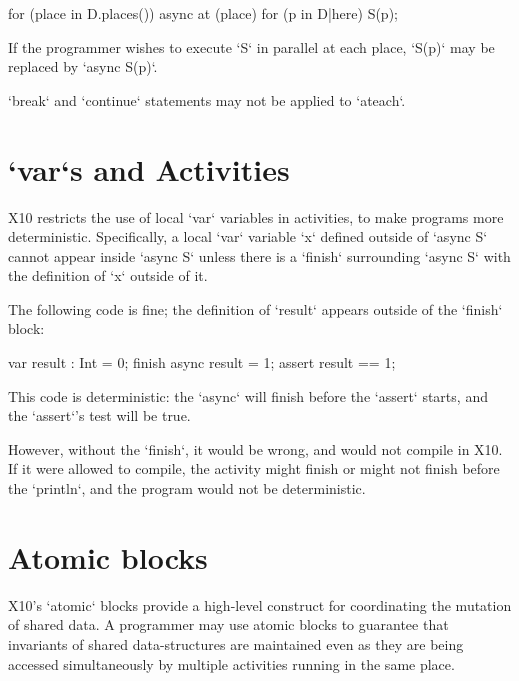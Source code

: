 \begin{xten}
for (place in D.places()) async at (place) {
    for (p in D|here) {
        S(p);
    }
}
\end{xten}

If the programmer wishes to execute \xcd`S` in parallel at each place,
\xcd`S(p)` may be replaced by 
\xcd`async S(p)`.

\xcd`break` and \xcd`continue` statements may not be applied to \xcd`ateach`.

\section{\xcd`var`s and Activities}

X10 restricts the use of local \xcd`var` variables in activities, to make
programs more deterministic. Specifically, a local \xcd`var` variable \xcd`x`
defined outside of \xcd`async S` cannot appear inside \xcd`async S` unless
there is a \xcd`finish` surrounding \xcd`async S` with the definition of
\xcd`x` outside of it.

\begin{ex}
The following code is fine; the definition of \xcd`result` appears outside of
the \xcd`finish` block: 
\begin{xten}
var result : Int = 0;
finish { 
  async result = 1;
}
assert result == 1;
\end{xten}

This code is deterministic: the \xcd`async` will finish before the
\xcd`assert` starts, and the \xcd`assert`'s test will be true.

However, without the
\xcd`finish`, it would be wrong, and would not compile in X10.  If it were
allowed to compile, the activity might finish or might not finish before the
\xcd`println`, and the program would not be deterministic.
\end{ex}


\section{Atomic blocks}\label{AtomicBlocks}

X10's \xcd`atomic` blocks provide a high-level construct for coordinating
the mutation of shared data. 
A programmer may use atomic blocks to guarantee that invariants of
shared data-structures are maintained even as they are being accessed
simultaneously by multiple activities running in the same place.  

